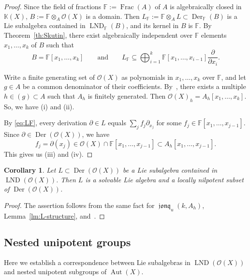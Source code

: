 \documentclass[12pt,a4paper]{amsart}
\theoremstyle{plain}
\newtheorem{corollary}[theorem]{Corollary}
\theoremstyle{definition}
\theoremstyle{remark}
\def\Aut{\operatorname{Aut}}
\def\Der{\operatorname{Der}}
\def\LND{\operatorname{LND}}
\def\Frac{\operatorname{Frac}}
\def\K{{\mathbb K}}
\def\FF{{\mathbb F}}
\def\cO{{\mathcal O}}
\DeclareMathOperator{\jonq}{\mathfrak{jonq}}
\begin{document}
\begin{proof} 
Since the field of fractions $\FF := \Frac(A)$ of $A$ is algebraically closed in $\K(X)$, 
$B := \FF \otimes_A \cO(X)$ is a domain. Then
$L_\FF := \FF \otimes_A L \subset \Der_\FF(B)$ is a Lie subalgebra contained in $\LND_\FF(B)$, and its kernel in $B$ is $\FF$.
By Theorem~\ref{th:Skutin}, there exist algebraically independent over $\FF$ elements $x_1,\dots,x_k$ of $B$ such that
\begin{equation}\label{eq:LF}
    B = \FF[x_1,\dots,x_k]
    \qquad\text{and}\qquad
    L_\FF \subseteq \bigoplus_{i=1}^k  \FF[x_1,\dots,x_{i-1}]\frac{\partial}{\partial x_i}.   
\end{equation}

Write a finite generating set of $\cO(X)$ as polynomials in $x_1,\dots,x_k$ over $\FF$, and let $g \in A$ be a common denominator of their coefficients.
By~\cite[Proposition~1.1]{OnYo82}, there exists a multiple $h\in (g) \subset A$ such that $A_h$ is finitely generated.
Then $ \cO(X)_h = A_h[x_1,\dots,x_k]$. So, we have (i) and (ii).
 
By \eqref{eq:LF}, every derivation $\partial \in L$ equals $\sum_j f_j \partial_{x_j}$ for some $f_j \in \FF[x_1,\dots,x_{j-1}]$.
Since $\partial\in\Der(\cO(X))$, we have
\[
f_j = \partial(x_j) \in \cO(X) \cap \FF[x_1,\dots,x_{j-1}]
     \subset A_h[x_1,\dots,x_{j-1}].
   \]
     This gives us (iii) and (iv). 
\qedhere
\end{proof}

\begin{corollary}
   Let $L \subset \Der( \cO(X))$ be a Lie subalgebra contained in $\LND( \cO(X))$.
   Then $L$ is a solvable Lie algebra and a locally nilpotent subset of $\Der(\cO(X))$.
\end{corollary}
\begin{proof}
   The assertion follows from the same fact for $\jonq_u(k,A_h)$, Lemma~\ref{lm:L-structure}, and~\cite[Proposition]{Skutin}.
\end{proof}


\subsection{Nested unipotent groups}\label{sec:nested-unip}
Here we establish a correspondence between Lie subalgebras in $\LND(\cO(X))$ and nested unipotent subgroups of $\Aut(X)$.
\end{document}
